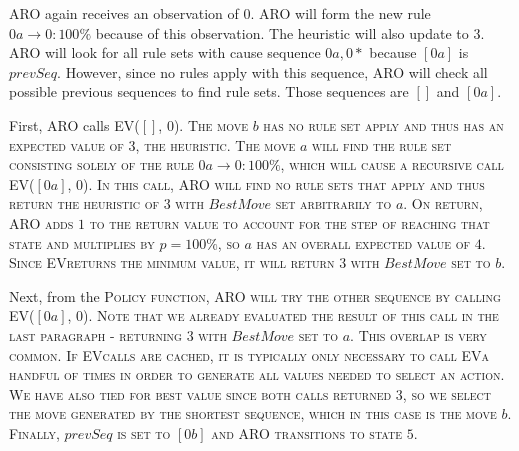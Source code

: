 \documentclass[letterpaper]{article} %
\begin{document}
ARO again receives an observation of $0$. ARO will form the new rule $0a \rightarrow 0: 100\%$ because of this observation. The heuristic will also update to $3$. ARO will look for all rule sets with cause sequence $0a,0*$ because $[0a]$ is $prevSeq$. However, since no rules apply with this sequence, ARO will check all possible previous sequences to find rule sets. Those sequences are $[]$ and $[0a]$. 

First, ARO calls \scshape EV($[]$, $0$)\normalfont. The move $b$ has no rule set apply and thus has an expected value of $3$, the heuristic. The move $a$ will find the rule set consisting solely of the rule $0a \rightarrow 0: 100\%$, which will cause a recursive call \scshape EV($[0a]$, $0$)\normalfont. In this call, ARO will find no rule sets that apply and thus return the heuristic of $3$ with $BestMove$ set arbitrarily to $a$. On return, ARO adds $1$ to the return value to account for the step of reaching that state and multiplies by $p = 100\%$, so $a$ has an overall expected value of $4$. Since \scshape EV\normalfont returns the minimum value, it will return $3$ with $BestMove$ set to $b$. 

Next, from the \scshape Policy \normalfont function, ARO will try the other sequence by calling \scshape EV($[0a]$, $0$)\normalfont. Note that we already evaluated the result of this call in the last paragraph - returning $3$ with $BestMove$ set to $a$. This overlap is very common. If \scshape EV\normalfont calls are cached, it is typically only necessary to call \scshape EV\normalfont a handful of times in order to generate all values needed to select an action. We have also tied for best value since both calls returned $3$, so we select the move generated by the shortest sequence, which in this case is the move $b$. Finally, $prevSeq$ is set to $[0b]$ and ARO transitions to state $5$.

\end{document}
